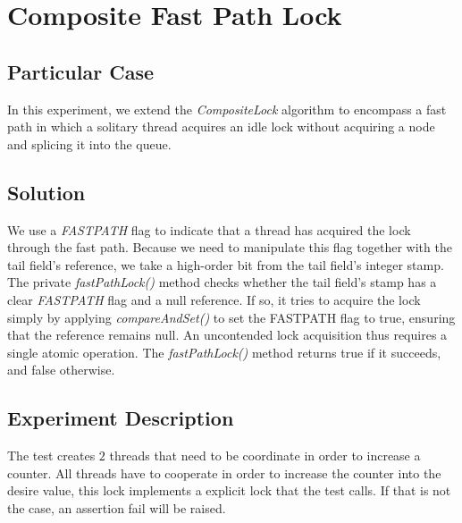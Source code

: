 


\section{\textbf{Composite Fast Path Lock}}



\subsection{Particular Case}
\par
In this experiment, we extend the \textit{CompositeLock} algorithm to encompass a fast path in which a solitary thread acquires an idle lock without acquiring a node and splicing it into the queue.
\par



\subsection{Solution}
\par
We use a \textit{FASTPATH} flag to indicate that a thread has acquired the lock through the fast path. Because we need to manipulate this flag together with the tail field’s reference, we take a high-order bit from the tail field’s integer stamp. The private \textit{fastPathLock()} method checks whether the tail field’s stamp has a clear \textit{FASTPATH} flag and a null reference. If so, it tries to acquire the lock simply by applying \textit{compareAndSet()} to set the FASTPATH flag to true, ensuring that the reference remains null. An uncontended lock acquisition thus requires a single atomic operation. The \textit{fastPathLock()} method returns true if it succeeds, and false otherwise.
\par


\subsection{Experiment Description} 
\par
The test creates $2$ threads that need to be coordinate in order to increase a counter. All threads have to cooperate in order to increase the counter into the desire value, this lock implements a explicit lock that the test calls.
If that is not the case, an assertion fail will be raised.
\par


